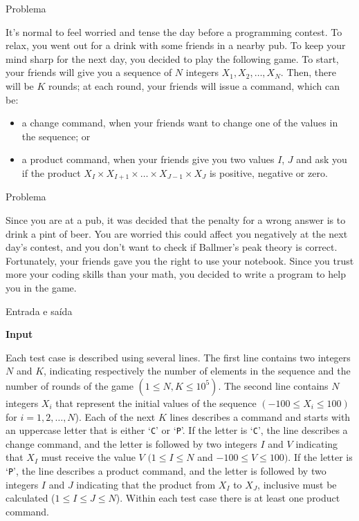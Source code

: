 
\begin{frame}[fragile]{Problema}

It’s normal to feel worried and tense the day before a programming contest. To relax, you went out 
for a drink with some friends in a nearby pub. To keep your mind sharp for the next day, you 
decided to play the following game. To start, your friends will give you a sequence of $N$ integers 
$X_1, X_2, \ldots, X_N$.  Then, there will be $K$ rounds; at each round, your friends will issue a 
command, which can be:
\begin{itemize}
    \item a change command, when your friends want to change one of the values in the sequence; or
    \item a product command, when your friends give you two values $I$, $J$ and ask you if the 
        product $X_I\times X_{I+1}\times \ldots\times X_{J-1}\times X_J$ is positive, negative or zero.
\end{itemize}

\end{frame}

\begin{frame}[fragile]{Problema}

Since you are at a pub, it was decided that the penalty for a wrong answer is to drink a pint of
beer. You are worried this could affect you negatively at the next day’s contest, and you don’t want
to check if Ballmer’s peak theory is correct. Fortunately, your friends gave you the right to use your
notebook. Since you trust more your coding skills than your math, you decided to write a program to
help you in the game.

\end{frame}

\begin{frame}[fragile]{Entrada e saída}

\textbf{Input}

Each test case is described using several lines. The first line contains two integers $N$ and $K$,
indicating respectively the number of elements in the sequence and the number of rounds of the game 
$(1\leq N, K\leq 10^5)$. 
The second line contains $N$ integers $X_i$ that represent the initial values of the sequence
$(-100\leq X_i\leq 100)$ for $i = 1, 2, \ldots, N$). Each of the next $K$ lines describes a command 
and starts with an uppercase letter that is either ‘\texttt{C}’ or ‘\texttt{P}’. 
If the letter is ‘\texttt{C}’, the line describes a change command, and the letter is followed by 
two integers $I$ and $V$ indicating that $X_I$ must receive the value $V$ $(1\leq I\leq N$ and 
$-100\leq V\leq 100)$. If the letter is ‘\texttt{P}’, the line describes a product command, and 
the letter is followed by two integers $I$ and $J$ indicating that the product from 
$X_I$ to $X_J$, inclusive must be calculated ($1\leq I\leq J\leq N$). Within each test case there 
is at least one product command.

\end{frame}

